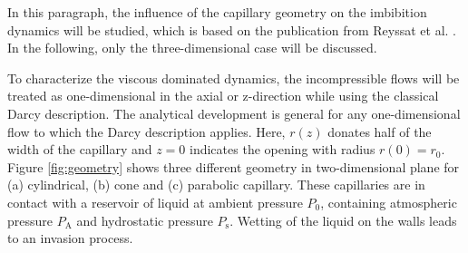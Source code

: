 \documentclass[aip, amsmath, amssymb, reprint, twocolumn, floatfix]{revtex4-1}
\newcommand{\Pa}{P_\mathrm{A}}
\newcommand{\Ps}{P_\mathrm{s}}
\begin{document}
In this paragraph, the influence of the capillary geometry on the imbibition dynamics will be studied, which is based on the publication from Reyssat et al. \cite{Reyssat2008}. In the following, only the three-dimensional case will be discussed.
\bigskip

To characterize the viscous dominated dynamics, the incompressible flows will be treated as one-dimensional in the axial or z-direction while using the classical Darcy description. The analytical development is general for any one-dimensional flow to which the Darcy description applies. Here, $r(z)$ donates half of the width of the capillary and $z = 0$ indicates the opening with radius $r(0) = r_0$. Figure \ref{fig:geometry} shows three different geometry in two-dimensional plane for (a) cylindrical, (b) cone and (c) parabolic capillary. These capillaries are in contact with a reservoir of liquid at ambient pressure $P_0$, containing atmospheric pressure $\Pa$ and hydrostatic pressure $\Ps$. Wetting of the liquid on the walls leads to an invasion process.

\begin{center}
	\captionsetup{type=figure}
	
	\label{fig:geometry}
\end{center}
\end{document}
